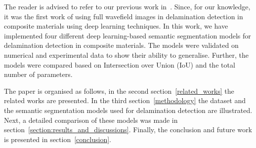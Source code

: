The reader is advised to refer to our previous work in~\cite{Ijjeh2021}. Since, for our knowledge, it was the first work of using full wavefield images in delamination detection in composite materials using deep learning techniques. 
In this work, we have implemented four different deep learning-based semantic segmentation models for delamination detection in composite materials.
The models were validated on numerical and experimental data to show their ability to generalise.
Further, the models were compared based on Intersection over Union (IoU) and the total number of parameters.

The paper is organised as follows, in the second section~\ref{related_works} the related works are presented.
In the third section~\ref{methodology} the dataset and the semantic segmentation models used for delamination detection are illustrated. 
Next, a detailed comparison of these models was made in section~\ref{section:results_and_discussions}.
Finally, the conclusion and future work is presented in section~\ref{conclusion}.